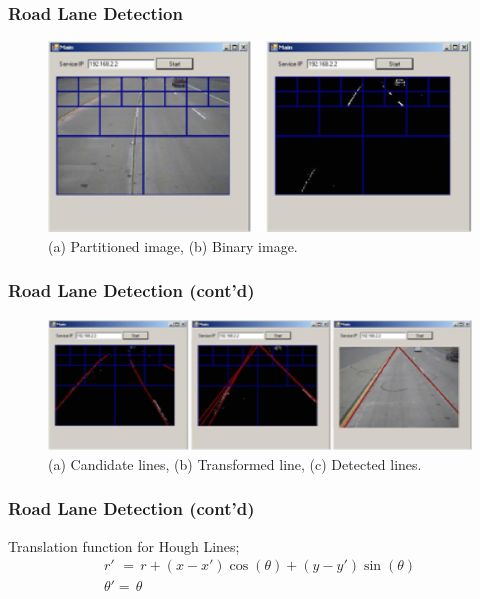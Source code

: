 \documentclass{beamer}
\begin{document}
\frame
{
	\frametitle{Road Lane Detection}
	\begin{figure}[ht]
	\begin{center}
	\includegraphics[width=.8\paperwidth]{../img/ldfig1.eps}
	\caption{(a) Partitioned image, (b) Binary image.}
	\label{fig:ldfig1}
	\end{center}
	\end{figure}
	\par
}

\frame
{
	\frametitle{Road Lane Detection (cont'd)}
	\begin{figure}[ht]
	\begin{center}
	\includegraphics[width=.8\paperwidth]{../img/ldfig2.eps}
	\caption{(a) Candidate lines, (b) Transformed line, (c) Detected lines.}
	\label{fig:ldfig2}
	\end{center}
	\end{figure}
}

\frame
{
	\frametitle{Road Lane Detection (cont'd)}
	Translation function for Hough Lines;
	\begin{equation} 
	\label{eq4} 
	\begin{array}{l} {r'\, \, =\, r+(x-x')\cos (\theta )+(y-y')\sin (\theta )} \\ {\theta '=\, \theta } \end{array} 
	\end{equation}
}
\end{document}
